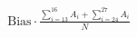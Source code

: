\documentclass[preview]{standalone}
\begin{document}
\begin{align*}
\text{Bias} \cdot \frac{\sum_{i= 13 }^{16} A_i + \sum_{i= 24 }^{27} A_i}{N}
\end{align*}
\end{document}
